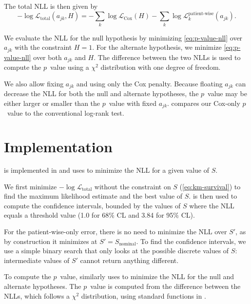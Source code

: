 \documentclass[article]{jss}
\begin{document}
The total NLL is then given by
\begin{equation}
-\log \mathcal{L}_{\text{total}}(a_{jk}, H) = -\sum_{k}\log\mathcal{L}_\text{Cox}(H) - \sum_{k}\log\mathcal{L}_k^{\text{patient-wise}}(a_{jk}).
\label{eq:p-value-nll}
\end{equation}

We evaluate the NLL for the null hypothesis by minimizing \cref{eq:p-value-nll} over \(a_{jk}\) with the constraint \(H=1\). For the alternate hypothesis, we minimize \cref{eq:p-value-nll} over both \(a_{jk}\) and \(H\). The difference between the two NLLs is used to compute the \(p\)~value using a \(\chi^2\) distribution with one degree of freedom.

We also allow fixing \(a_{jk}\) and using only the Cox penalty. Because floating \(a_{jk}\) can decrease the NLL for both the null and alternate hypotheses, the \(p\)~value may be either larger or smaller than the \(p\)~value with fixed \(a_{jk}\).  compares our Cox-only \(p\)~value to the conventional log-rank test.

\section{Implementation}

 is implemented in  and uses  \citep{gurobi} to minimize the NLL for a given value of \(S\).

We first minimize \(-\log \mathcal{L}_{\text{total}}\) without the constraint on \(S\) (\ref{eq:km-survival}) to find the maximum likelihood estimate and the best value of \(S\)\@.  \citep{brentq,scipy} is then used to compute the confidence intervals, bounded by the values of \(S\) where the NLL equals a threshold value (1.0 for 68\% CL and 3.84 for 95\% CL).

For the patient-wise-only error, there is no need to minimize the NLL over \(S'\), as by construction it minimizes at \(S'=S_\text{nominal}\). To find the confidence intervals, we use a simple binary search that only looks at the possible discrete values of \(S\): intermediate values of \(S'\) cannot return anything different.

To compute the \(p\)~value,  similarly uses  to minimize the NLL for the null and alternate hypotheses. The \(p\)~value is computed from the difference between the NLLs, which follows a \(\chi^2\) distribution, using standard functions in .
\end{document}
